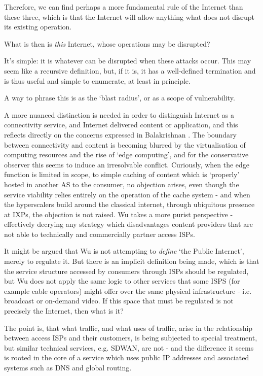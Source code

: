  Therefore, we can find perhaps a more fundamental rule of the Internet than these three, which is that the Internet will allow anything what does not disrupt its existing operation.

 What is then is \textit{this} Internet, whose operations may be disrupted?
 
 It's simple: it is whatever can be disrupted when these attacks occur.  This may seem like a recursive definition, but, if it is, it has a well-defined termination and is thus useful and simple to enumerate, at least in principle.

 A way to phrase this is as the `blast radius', or as a scope of vulnerability.

 A more nuanced distinction is needed in order to distinguish Internet as a connectivity service, and Internet delivered content or application, and this reflects directly on the concerns expressed in Balakrishnan \cite{Balakrishnan2021}.  The boundary between connectivity and content is becoming blurred by the virtualisation of computing resources and the rise of `edge computing', and for the conservative observer this seems to induce an irresolvable conflict. Curiously, when the edge function is limited in scope, to simple caching of content which is `properly' hosted in another AS to the consumer, no objection arises, even though the service viability relies entirely on the operation of the cache system - and when the hyperscalers build around the classical internet, through ubiquitous presence at IXPs, the objection is not raised.  Wu takes a more purist perspective - effectively decrying any strategy which disadvantages content providers that are not able to technically and commercially partner access ISPs.

 It might be argued that Wu is not attempting to \textit{define} `the Public Internet', merely to regulate it.  But there is an implicit definition being made, which is that the service structure accessed by consumers through ISPs should be regulated, but Wu does not apply the same logic to other services that some ISPS (for example cable operators) might offer over the same physical infrastructure - i.e. broadcast or on-demand video.  If this space that must be regulated is not precisely the Internet, then what is it?

 The point is, that what traffic, and what uses of traffic, arise in the relationship between access ISPs and their customers, is being subjected to special treatment, but similar technical services, e.g. SDWAN, are not - and the difference it seems is rooted in the core of a service which uses public IP addresses and associated systems such as DNS and global routing.

